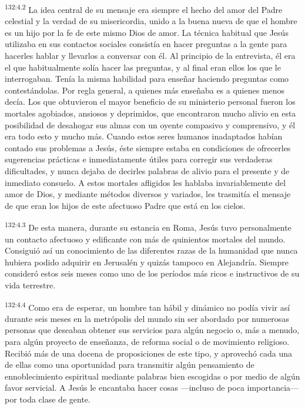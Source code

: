 \par 
\textsuperscript{132:4.2} La idea central de su mensaje era siempre el hecho del amor del Padre celestial y la verdad de su misericordia, unido a la buena nueva de que el hombre es un hijo por la fe de este mismo Dios de amor. La técnica habitual que Jesús utilizaba en sus contactos sociales consistía en hacer preguntas a la gente para hacerles hablar y llevarlos a conversar con él. Al principio de la entrevista, él era el que habitualmente solía hacer las preguntas, y al final eran ellos los que le interrogaban. Tenía la misma habilidad para enseñar haciendo preguntas como contestándolas. Por regla general, a quienes más enseñaba es a quienes menos decía. Los que obtuvieron el mayor beneficio de su ministerio personal fueron los mortales agobiados, ansiosos y deprimidos, que encontraron mucho alivio en esta posibilidad de desahogar sus almas con un oyente compasivo y comprensivo, y él era todo esto y mucho más. Cuando estos seres humanos inadaptados habían contado sus problemas a Jesús, éste siempre estaba en condiciones de ofrecerles sugerencias prácticas e inmediatamente útiles para corregir sus verdaderas dificultades, y nunca dejaba de decirles palabras de alivio para el presente y de inmediato consuelo. A estos mortales afligidos les hablaba invariablemente del amor de Dios, y mediante métodos diversos y variados, les trasmitía el mensaje de que eran los hijos de este afectuoso Padre que está en los cielos.

\par 
\textsuperscript{132:4.3} De esta manera, durante su estancia en Roma, Jesús tuvo personalmente un contacto afectuoso y edificante con más de quinientos mortales del mundo. Consiguió así un conocimiento de las diferentes razas de la humanidad que nunca hubiera podido adquirir en Jerusalén y quizás tampoco en Alejandría. Siempre consideró estos seis meses como uno de los períodos más ricos e instructivos de su vida terrestre.

\par 
\textsuperscript{132:4.4} Como era de esperar, un hombre tan hábil y dinámico no podía vivir así durante seis meses en la metrópolis del mundo sin ser abordado por numerosas personas que deseaban obtener sus servicios para algún negocio o, más a menudo, para algún proyecto de enseñanza, de reforma social o de movimiento religioso. Recibió más de una docena de proposiciones de este tipo, y aprovechó cada una de ellas como una oportunidad para transmitir algún pensamiento de ennoblecimiento espiritual mediante palabras bien escogidas o por medio de algún favor servicial. A Jesús le encantaba hacer cosas ---incluso de poca importancia--- por toda clase de gente.

